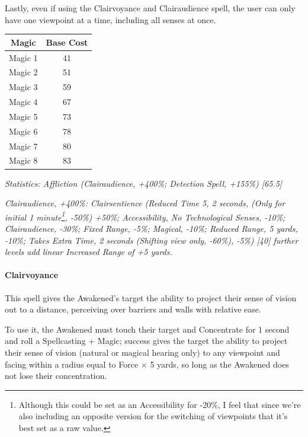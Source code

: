 \begin{multicols*}{3}
	Lastly, even if using the Clairvoyance and Clairaudience spell, the user can only have one viewpoint at a time, including all senses at once.
	
	\begin{center}
		\begin{tabular}{|c|c|}
			\hline
			Magic & Base Cost \\
			\hline
			\hline
			Magic 1 & 41 \\
			Magic 2 & 51 \\
			Magic 3 & 59 \\
			Magic 4 & 67 \\
			Magic 5 & 73 \\
			Magic 6 & 78 \\
			Magic 7 & 80 \\
			Magic 8 & 83 \\
			\hline
		\end{tabular}
	\end{center}
	
	\textcolor{OliveGreen}{\textit{ Statistics: Affliction (Clairaudience, +400\%; Detection Spell, +155\%) [65.5]}}
	
	\textcolor{OliveGreen}{\textit{Clairaudience, +400\%: Clairsentience (Reduced Time 5, 2 seconds, (Only for initial 1 minute\footnote{Although this could be set as an Accessibility for -20\%, I feel that since we're also including an opposite version for the switching of viewpoints that it's best set as a raw value.}, -50\%) +50\%; Accessibility, No Technological Senses, -10\%; Clairaudience, -30\%; Fixed Range, -5\%; Magical, -10\%; Reduced Range, 5 yards, -10\%; Takes Extra Time, 2 seconds (Shifting view only, -60\%), -5\%) [40] further levels add linear Increased Range of +5 yards.}}
	
	\paragraph{Clairvoyance}
		
	This spell gives the Awakened's target the ability to project their sense of vision out to a distance, perceiving over barriers and walls with relative ease.
	
	To use it, the Awakened must touch their target and Concentrate for 1 second and roll a Spellcasting + Magic; success gives the target the ability to project their sense of vision (natural or magical hearing only) to any viewpoint and facing within a radius equal to Force $\times$ 5 yards, so long as the Awakened does not lose their concentration. 
	

\end{multicols*}

